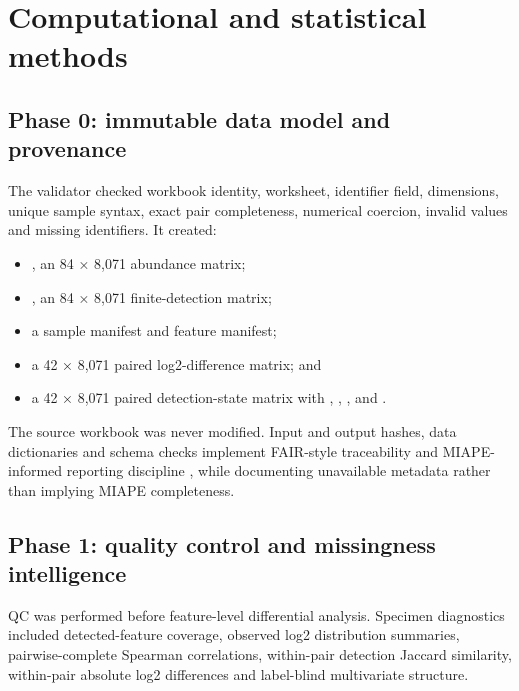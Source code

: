 \chapter{Computational and statistical methods}
\label{chap:computational_and_statistical_methods}

\section{Phase 0: immutable data model and provenance}
\label{sec:phase_0_immutable_data_model_and_provenance}

The validator checked workbook identity, worksheet, identifier field, dimensions, unique sample syntax, exact pair completeness, numerical coercion, invalid values and missing identifiers. It created:

\begin{itemize}
\item {}, an 84 × 8,071 abundance matrix;
\item \texttt{}, an 84 × 8,071 finite-detection matrix;
\item a sample manifest and feature manifest;
\item a 42 × 8,071 paired log2-difference matrix; and
\item a 42 × 8,071 paired detection-state matrix with \texttt{}, \texttt{}, \texttt{}, and \texttt{}.
\end{itemize}

The source workbook was never modified. Input and output hashes, data dictionaries and schema checks implement FAIR-style traceability \parencite{wilkinson2016} and MIAPE-informed reporting discipline \parencite{taylor2007}, while documenting unavailable metadata rather than implying MIAPE completeness.

\section{Phase 1: quality control and missingness intelligence}
\label{sec:phase_1_quality_control_and_missingness_intelligence}

QC was performed before feature-level differential analysis. Specimen diagnostics included detected-feature coverage, observed log2 distribution summaries, pairwise-complete Spearman correlations, within-pair detection Jaccard similarity, within-pair absolute log2 differences and label-blind multivariate structure.

